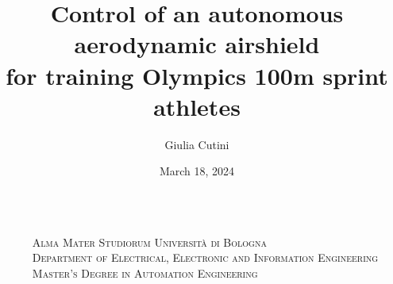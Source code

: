 \documentclass[9pt, aspectratio=169]{beamer}
\title[Control of an autonomous aerodynamic airshield for training Olympics 100m sprint athletes]
  {\Large Control of an autonomous aerodynamic airshield \\
for training Olympics 100m sprint athletes}
\author[Giulia Cutini]{Giulia Cutini}
\institute[University of Bologna]{}
\date{March 18, 2024}
\begin{document}
\footnotesize

\begin{frame}

\begin{columns}
\begin{column}{0.15\textwidth}
\end{column}

\begin{column}{0.85\textwidth}
\centering
\fontsize{9}{11}\selectfont
\vspace{0.8cm}
\begin{columns}
\begin{column}{1.1\textwidth}
\centering \small
\textsc{Alma Mater Studiorum Universit\`{a} di Bologna}\\
\textsc{Department of Electrical, Electronic and Information Engineering}
\\
\vspace{0.1cm}
\textsc{Master's Degree in Automation Engineering}
\end{column}
\end{columns}

\vspace{0.7cm}

\textcolor{blue@Thesis}{\bf \inserttitle}

\vspace{1cm}


\end{column}
\end{columns}
\end{frame}
\end{document}

